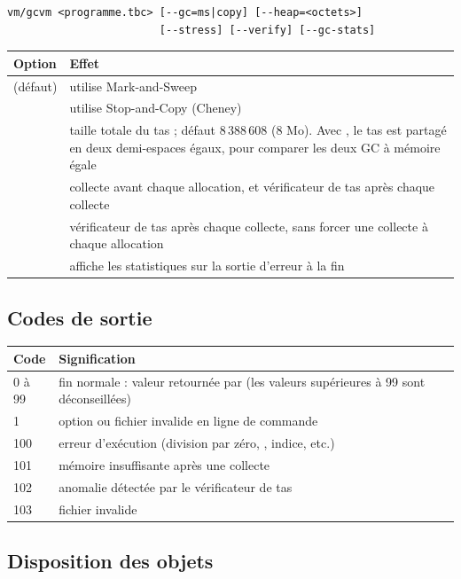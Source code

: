 \documentclass[11pt,a4paper]{article}
\newcommand{\code}[1]{\texttt{\detokenize{#1}}}
\begin{document}
\begin{lstlisting}
vm/gcvm <programme.tbc> [--gc=ms|copy] [--heap=<octets>]
                        [--stress] [--verify] [--gc-stats]
\end{lstlisting}

\begin{longtable}{@{}p{} p{}@{}}
\toprule
\textbf{Option} & \textbf{Effet} \\
\midrule
\endhead
\code{--gc=ms} (défaut) & utilise Mark-and-Sweep \\
\code{--gc=copy} & utilise Stop-and-Copy (Cheney) \\
\code{--heap=<octets>} & taille totale du tas ; défaut 8\,388\,608 (8 Mo). Avec \code{copy}, le tas est partagé en deux demi-espaces égaux, pour comparer les deux GC à mémoire égale \\
\code{--stress} & collecte avant chaque allocation, et vérificateur de tas après chaque collecte \\
\code{--verify} & vérificateur de tas après chaque collecte, sans forcer une collecte à chaque allocation \\
\code{--gc-stats} & affiche les statistiques sur la sortie d'erreur à la fin \\
\bottomrule
\end{longtable}

\subsection{Codes de sortie}

\begin{longtable}{@{}p{} p{}@{}}
\toprule
\textbf{Code} & \textbf{Signification} \\
\midrule
\endhead
0 à 99 & fin normale : valeur retournée par \code{main} (les valeurs supérieures à 99 sont déconseillées) \\
1 & option ou fichier invalide en ligne de commande \\
100 & erreur d'exécution (division par zéro, \code{null}, indice, etc.) \\
101 & mémoire insuffisante après une collecte \\
102 & anomalie détectée par le vérificateur de tas \\
103 & fichier \code{.tbc} invalide \\
\bottomrule
\end{longtable}

\subsection{Disposition des objets}
\end{document}
